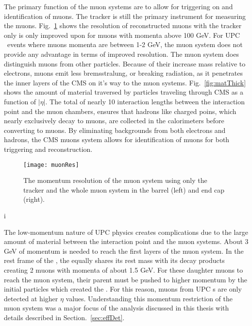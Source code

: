     The primary function of the muon systems are to allow for triggering on and
      identification of muons.
    The tracker is still the primary instrument for measuring the muons. 
    Fig.~\ref{fig:muonRes} shows the resolution of reconstructed muons with 
      the tracker only is only improved upon for muons with momenta above 
      100 GeV. 
    For UPC \JPsi{}~events where muons momenta are between 1-2 GeV, the muon
      system does not provide any advantage in terms of improved resolution.
    The muon system does distinguish muons from other particles.
    Because of their increase mass relative to electrons, muons emit less 
      bremsstralung, or breaking radiation, as it penetrates the inner layers
      of the CMS on it's way to the muon systems.
    Fig.~\ref{fig:matThick} shows the amount of material traversed by particles
      traveling through CMS as a function of $|\eta|$.
    The total of nearly 10 interaction lengths between the interaction point 
      and the muon chambers, ensures that hadrons like charged poins, which
      nearly exclusively decay to muons, are collected in the calorimeters 
      before converting to muons. 
    By eliminating backgrounds from both electrons and hadrons, the CMS muons 
      system allows for identification of muons for both triggering and 
      reconstruction.
  
    \begin{figure}[!Hhbt]
      \centering
      \texttt{[image: muonRes]}
      \caption{ The momentum resolution of the muon system using only the 
        tracker and the whole muon system in the barrel (left) and end cap 
        (right).}
      \label{fig:muonRes}
    \end{figure}i

    The low-momentum nature of UPC physics creates complications due to the 
      large amount of material between the interaction point and the muon 
      systems.
    About 3 GeV of momentum is needed to reach the first layers of the muon 
      system.
    In the rest frame of the \JPsi{}, the \JPsi{} equally shares its rest mass with 
      its decay products creating 2 muons with momenta of about 1.5 GeV.
    For these daughter muons to reach the muon system, their parent \JPsi{} must
      be pushed to higher momentum by the initial particles which created the
      \JPsi{}.
    For this reason, muons from UPC \JPsi{}s are only detected at higher 
      $\eta$ values.
    Understanding this momentum restriction of the muon system was a major 
      focus of the analysis discussed in this thesis with details described in 
      Section.~\ref{sec:effDet}.

